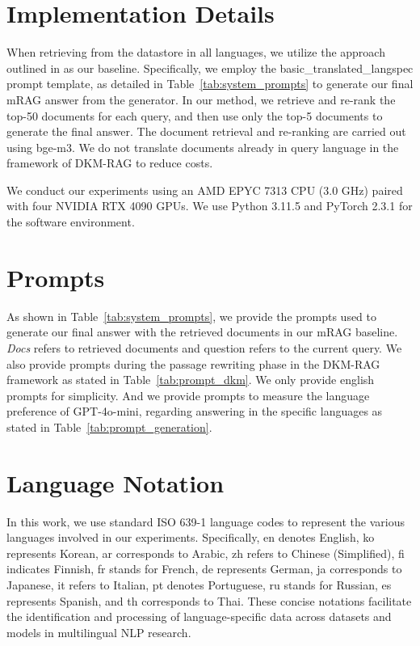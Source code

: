 \clearpage
\appendix

\section{Implementation Details}
When retrieving from the datastore in all languages, we utilize the approach outlined in \cite{chirkova-etal-2024-retrieval} as our baseline. Specifically, we employ the basic\_translated\_langspec prompt template, as detailed in Table~\ref{tab:system_prompts} to generate our final mRAG answer from the generator. In our method, we retrieve and re-rank the top-50 documents for each query, and then use only the top-5 documents to generate the final answer. The document retrieval and re-ranking are carried out using bge-m3. We do not translate documents already in query language in the framework of DKM-RAG to reduce costs.

We conduct our experiments using an AMD EPYC 7313 CPU (3.0 GHz) paired with four NVIDIA RTX 4090 GPUs. We use Python 3.11.5 and PyTorch 2.3.1 for the software environment.


\section{Prompts}
\label{appendix:prompts}
As shown in Table~\ref{tab:system_prompts}, we provide the prompts used to generate our final answer with the retrieved documents in our mRAG baseline. \textit{Docs} refers to retrieved documents and question refers to the current query. We also provide prompts during the passage rewriting phase in the DKM-RAG framework as stated in Table~\ref{tab:prompt_dkm}. We only provide english prompts for simplicity. And we provide prompts to measure the language preference of GPT-4o-mini, regarding answering in the specific languages as stated in Table~\ref{tab:prompt_generation}.





\section{Language Notation}
In this work, we use standard ISO 639-1 language codes to represent the various languages involved in our experiments. Specifically, en denotes English, ko represents Korean, ar corresponds to Arabic, zh refers to Chinese (Simplified), fi indicates Finnish, fr stands for French, de represents German, ja corresponds to Japanese, it refers to Italian, pt denotes Portuguese, ru stands for Russian, es represents Spanish, and th corresponds to Thai. These concise notations facilitate the identification and processing of language-specific data across datasets and models in multilingual NLP research.


